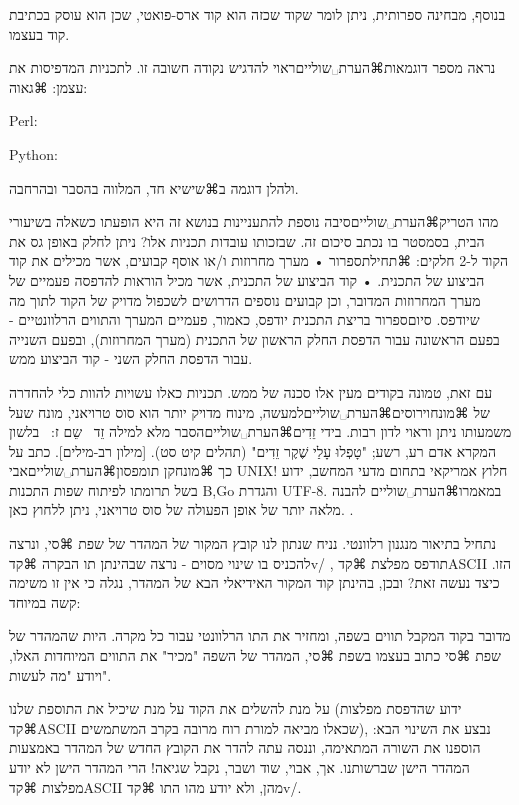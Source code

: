 {בנוסף, מבחינה ספרותית, ניתן לומר שקוד שכזה הוא קוד ארס-פואטי, שכן הוא עוסק בכתיבת קוד בעצמו. 

נראה מספר דוגמאות⌘הערת␣שוליים{ראוי להדגיש נקודה חשובה זו.} לתכניות המדפיסות את עצמן:
⌘גאוה:


Perl:



Python:

ולהלן דוגמה ב⌘שי{שיא חד}, המלווה בהסבר ובהרחבה.



מהו הטריק⌘הערת␣שוליים{סיבה נוספת להתעניינות בנושא זה היא הופעתו כשאלה בשיעורי הבית, בסמסטר בו נכתב סיכום זה.} שבזכותו עובדות תכניות אלו? ניתן לחלק באופן גס את הקוד ל-2 חלקים: 
⌘תחילת{ספרור}
• מערך מחרוזות ו/או אוסף קבועים, אשר מכילים את קוד הביצוע של התכנית.
• קוד הביצוע של התכנית, אשר מכיל הוראות להדפסה פעמיים של מערך המחרוזות המדובר, וכן קבועים נוספים הדרושים לשכפול מדויק של הקוד לתוך מה שיודפס. 
סיום{ספרור}
בריצת התכנית יודפס, כאמור, פעמיים המערך והתווים הרלוונטיים - בפעם הראשונה עבור הדפסת החלק הראשון של התכנית (מערך המחרוזות), ובפעם השנייה עבור הדפסת החלק השני - קוד הביצוע ממש. 

עם זאת, טמונה בקודים מעין אלו סכנה של ממש. תכניות כאלו עשויות להוות כלי להחדרה של ⌘מונח{וירוסים}⌘הערת␣שוליים{למעשה, מינוח מדויק יותר הוא סוס טרויאני, מונח שעל משמעותו ניתן וראוי לדון רבות.} בידי זֵדִים⌘הערת␣שוליים{הסבר מלא למילה זֵד  שֵם ז:  בלשון המקרא אדם רע, רשע; "טָפְלוּ עָלַי שֶׁקֶר זֵדִים" (תהלים קיט סט). [מילון רב-מילים]}. כתב על כך ⌘מונח{קן תומפסון}⌘הערת␣שוליים{אבי UNIX! חלוץ אמריקאי בתחום מדעי המחשב, ידוע בשל תרומתו לפיתוח שפות התכנות B,Go והגדרת UTF-8.} במאמרו⌘הערת␣שוליים {להבנה מלאה יותר של אופן הפעולה של סוס טרויאני, ניתן ללחוץ כאן.
 }.

נתחיל בתיאור מנגנון רלוונטי. נניח שנתון לנו קובץ המקור של המהדר של שפת ⌘סי, ונרצה להכניס בו שינוי מסוים - נרצה שבהינתן תו הבקרה ⌘קד{v/} , תודפס מפלצת ⌘קד{ASCII} הזו. כיצד נעשה זאת? ובכן, בהינתן קוד המקור האידיאלי הבא של המהדר, נגלה כי אין זו משימה קשה במיוחד:

מדובר בקוד המקבל תווים בשפה, ומחזיר את התו הרלוונטי עבור כל מקרה. היות שהמהדר של שפת ⌘סי כתוב בעצמו בשפת ⌘סי, המהדר של השפה "מכיר" את התווים המיוחדות האלו, ויודע "מה לעשות". 

על מנת להשלים את הקוד על מנת שיכיל את התוספת שלנו (ידוע שהדפסת מפלצות ⌘קד{ASCII} שכאלו מביאה למורת רוח מרובה בקרב המשתמשים), נבצע את השינוי הבא: 
הוספנו את השורה המתאימה, וננסה עתה להדר את הקובץ החדש של המהדר באמצעות המהדר הישן שברשותנו. אך, אבוי, שוד ושבר, נקבל שגיאה! הרי המהדר הישן לא יודע מפלצות ⌘קד{ASCII} מהן, ולא יודע מהו התו ⌘קד{v/}. 

}
